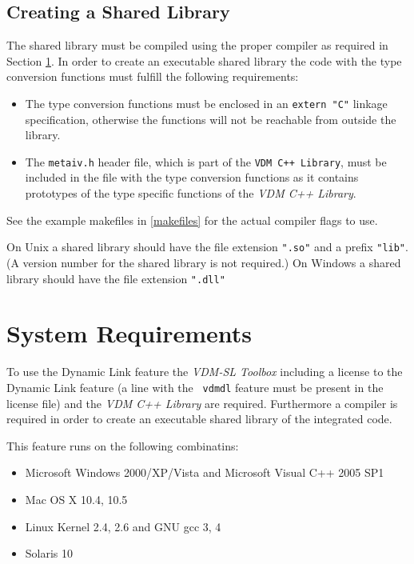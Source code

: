 \documentclass[\pformat,12pt]{article}
\begin{document}
\subsection{Creating a Shared Library}\label{sec:create}

The shared library must be compiled using the proper compiler as
required in Section \ref{sec:sysreq}.  In order to create an
executable shared library the code with the type conversion functions
must fulfill the following requirements:
\begin{itemize}
\item The type conversion functions must be enclosed in an {\tt extern "C"}
linkage specification, otherwise the functions will not be reachable from
outside the library.
\item The {\tt metaiv.h} header file, which is part of the {\tt VDM
    C++ Library}, must be included in the file with the type
  conversion functions as it contains prototypes of the type specific
  functions of the {\it VDM C++ Library}.
\end{itemize}

See the example makefiles in \ref{makefiles} for the actual compiler
flags to use.

On Unix a shared library should have the file extension {\tt ".so"} and 
a prefix {\tt "lib"}. (A version number for the shared library is not
required.) On Windows a shared library should have the file extension 
\texttt{".dll"}

\newpage


\newpage
\appendix

\section{System Requirements}
\label{sec:sysreq}

To use the Dynamic Link feature the {\it VDM-SL Toolbox}
including a license to the Dynamic Link feature (a line with the {\tt
  vdmdl} feature must be present in the license file) and the {\it VDM
  C++ Library} are required. Furthermore a compiler is required in
order to create an executable shared library of the integrated code.

This feature runs on the following combinatins:
\begin{itemize}
\item Microsoft Windows 2000/XP/Vista and Microsoft Visual C++ 2005 SP1
\item Mac OS X 10.4, 10.5
\item Linux Kernel 2.4, 2.6 and GNU gcc 3, 4
\item Solaris 10
\end{itemize}
\end{document}
